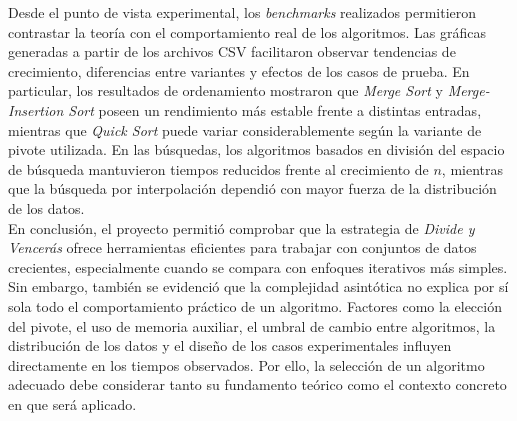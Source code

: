 Desde el punto de vista experimental, los \textit{benchmarks} realizados permitieron contrastar la teoría con el comportamiento real de los algoritmos. Las gráficas generadas a partir de los archivos CSV facilitaron observar tendencias de crecimiento, diferencias entre variantes y efectos de los casos de prueba. En particular, los resultados de ordenamiento mostraron que \textit{Merge Sort} y \textit{Merge-Insertion Sort} poseen un rendimiento más estable frente a distintas entradas, mientras que \textit{Quick Sort} puede variar considerablemente según la variante de pivote utilizada. En las búsquedas, los algoritmos basados en división del espacio de búsqueda mantuvieron tiempos reducidos frente al crecimiento de $n$, mientras que la búsqueda por interpolación dependió con mayor fuerza de la distribución de los datos. \\

En conclusión, el proyecto permitió comprobar que la estrategia de \textit{Divide y Vencerás} ofrece herramientas eficientes para trabajar con conjuntos de datos crecientes, especialmente cuando se compara con enfoques iterativos más simples. Sin embargo, también se evidenció que la complejidad asintótica no explica por sí sola todo el comportamiento práctico de un algoritmo. Factores como la elección del pivote, el uso de memoria auxiliar, el umbral de cambio entre algoritmos, la distribución de los datos y el diseño de los casos experimentales influyen directamente en los tiempos observados. Por ello, la selección de un algoritmo adecuado debe considerar tanto su fundamento teórico como el contexto concreto en que será aplicado. \\